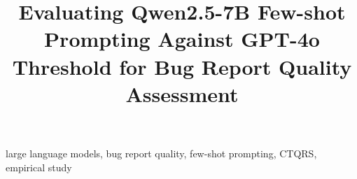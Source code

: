 \documentclass[conference]{IEEEtran}
\begin{document}
\title{Evaluating Qwen2.5-7B Few-shot Prompting Against GPT-4o Threshold for Bug Report Quality Assessment}
\author{
}
\maketitle
\begin{abstract}

\end{abstract}
\begin{IEEEkeywords}
large language models, bug report quality, few-shot prompting, CTQRS, empirical study
\end{IEEEkeywords}









\end{document}

